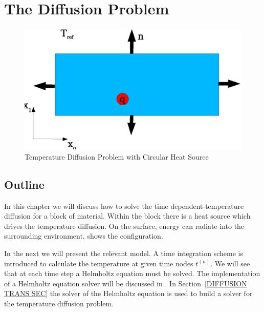 \section{The Diffusion Problem}
\label{DIFFUSION CHAP}

\begin{figure}
\centerline{\includegraphics[width=\figwidth]{DiffusionDomain}}
\caption{Temperature Diffusion Problem with Circular Heat Source}
\label{DIFFUSION FIG 1}
\end{figure}

\subsection{\label{DIFFUSION OUT SEC}Outline}
In this chapter we will discuss how to solve the time dependent-temperature diffusion for
a block of material. Within the block there is a heat source which drives the temperature diffusion.
On the surface, energy can radiate into the surrounding environment.
 shows the configuration.

In the next  we will present the relevant model. A 
time integration scheme is introduced to calculate the temperature at given time nodes $t^{(n)}$. 
We will see that at each time step a Helmholtz equation  
must be solved. 
The implementation of a Helmholtz equation solver will be discussed in . 
In Section~\ref{DIFFUSION TRANS SEC} the solver of the Helmholtz equation is used to build a
solver for the temperature diffusion problem. 

